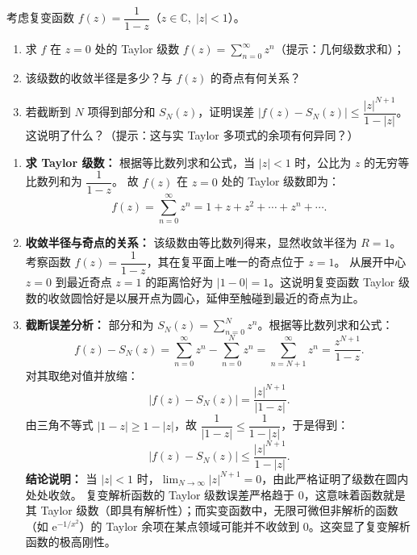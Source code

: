 \documentclass[lang=cn,11pt]{elegantbook}
\begin{document}
\begin{exercise}
考虑复变函数 $f(z)=\dfrac{1}{1-z}$（$z\in\mathbb C,\;|z|<1$）。
\begin{enumerate}
  \item[(1)] 求 $f$ 在 $z=0$ 处的 Taylor 级数 $\displaystyle f(z)=\sum_{n=0}^{\infty}z^n$（提示：几何级数求和）；
  \item[(2)] 该级数的收敛半径是多少？与 $f(z)$ 的奇点有何关系？
  \item[(3)] 若截断到 $N$ 项得到部分和 $S_N(z)$，证明误差 $|f(z)-S_N(z)|\leq\dfrac{|z|^{N+1}}{1-|z|}$。这说明了什么？（提示：这与实 Taylor 多项式的余项有何异同？）
\end{enumerate}
\end{exercise}
\begin{solution}
\begin{enumerate}
  \item[(1)] \textbf{求 Taylor 级数：}
  根据等比数列求和公式，当 $|z|<1$ 时，公比为 $z$ 的无穷等比数列和为 $\dfrac{1}{1-z}$。
  故 $f(z)$ 在 $z=0$ 处的 Taylor 级数即为：
  \[
  f(z) = \sum_{n=0}^{\infty} z^n = 1 + z + z^2 + \cdots + z^n + \cdots.
  \]
  
  \item[(2)] \textbf{收敛半径与奇点的关系：}
  该级数由等比数列得来，显然收敛半径为 $R=1$。
  考察函数 $f(z) = \dfrac{1}{1-z}$，其在复平面上唯一的奇点位于 $z=1$。
  从展开中心 $z=0$ 到最近奇点 $z=1$ 的距离恰好为 $|1-0|=1$。这说明复变函数 Taylor 级数的收敛圆恰好是以展开点为圆心，延伸至触碰到最近的奇点为止。
  
  \item[(3)] \textbf{截断误差分析：}
  部分和为 $S_N(z) = \sum_{n=0}^N z^n$。根据等比数列求和公式：
  \[
  f(z) - S_N(z) = \sum_{n=0}^{\infty} z^n - \sum_{n=0}^N z^n = \sum_{n=N+1}^{\infty} z^n = \frac{z^{N+1}}{1-z}.
  \]
  对其取绝对值并放缩：
  \[
  |f(z) - S_N(z)| = \frac{|z|^{N+1}}{|1-z|}.
  \]
  由三角不等式 $|1-z| \ge 1 - |z|$，故 $\dfrac{1}{|1-z|} \le \dfrac{1}{1-|z|}$，于是得到：
  \[
  |f(z) - S_N(z)| \le \frac{|z|^{N+1}}{1-|z|}.
  \]
  \textbf{结论说明：} 当 $|z|<1$ 时，$\lim_{N \to \infty} |z|^{N+1} = 0$，由此严格证明了级数在圆内处处收敛。
  复变解析函数的 Taylor 级数误差严格趋于 0，这意味着函数就是其 Taylor 级数（即具有解析性）；而实变函数中，无限可微但非解析的函数（如 $\mathrm{e}^{-1/x^2}$）的 Taylor 余项在某点领域可能并不收敛到 0。这突显了复变解析函数的极高刚性。
\end{enumerate}
\end{solution}
\end{document}
